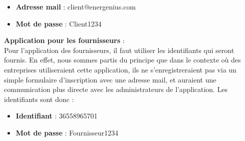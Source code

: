 \documentclass[../rapport.tex]{subfiles}
\begin{document}
\begin{itemize}
  \item \textbf{Adresse mail} : client@energenius.com
  \item \textbf{Mot de passe} : Client1234 \\
\end{itemize}


\textbf{Application pour les fournisseurs} : \\ 
Pour l'application des fournisseurs, il faut utiliser les identifiants qui seront fournis. En effet, nous sommes partis du principe que dans le contexte où des entreprises utiliseraient cette application, ils ne s'enregistreraient pas via un simple formulaire d'inscription avec une adresse mail, et auraient une communication plus directe avec les administrateurs de l'application. Les identifiants sont donc : \\
\begin{itemize}
  \item \textbf{Identifiant} : 36558965701
  \item \textbf{Mot de passe} : Fournisseur1234
\end{itemize}
\end{document}
